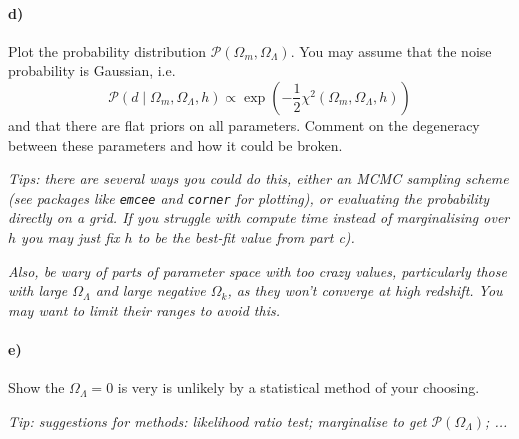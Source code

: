 \documentclass[12pt]{article}
\begin{document}
\paragraph{d)}
Plot the probability distribution $\mathcal{P}(\Omega_m, \Omega_\Lambda)$. You may assume that the noise probability is Gaussian, i.e.
\begin{equation}
\mathcal{P}(d \mid \Omega_m, \Omega_\Lambda, h) \propto \exp{\left(-\frac{1}{2}\chi^2(\Omega_m, \Omega_\Lambda, h)\right)}
\end{equation}
and that there are flat priors on all parameters. Comment on the degeneracy between these parameters and how it could be broken.

\emph{Tips: there are several ways you could do this, either an MCMC sampling scheme (see packages like \texttt{emcee} and \texttt{corner} for plotting), or evaluating the probability directly on a grid. If you struggle with compute time instead of marginalising over $h$ you may just fix $h$ to be the best-fit value from part c).}

\emph{Also, be wary of parts of parameter space with too crazy values, particularly those with large $\Omega_\Lambda$ and large negative $\Omega_k$, as they won't converge at high redshift. You may want to limit their ranges to avoid this.
}


\paragraph{e)}
Show the $\Omega_\Lambda = 0$ is very is unlikely by a statistical method of your choosing.

\emph{Tip: suggestions for methods: likelihood ratio test; marginalise to get $\mathcal{P}(\Omega_\Lambda)$; ...}
\end{document}
